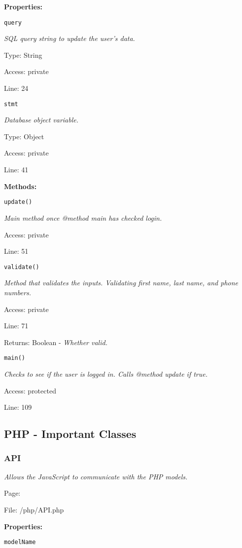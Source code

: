 \textbf{Properties:}

\texttt{query}

{\scriptsize
\textit{SQL query string to update the user's data.}

Type: String

Access: private

Line: 24

}
\texttt{stmt}

{\scriptsize
\textit{Database object variable.}

Type: Object

Access: private

Line: 41

}
\textbf{Methods:}

\texttt{update()}

{\scriptsize
\textit{Main method once @method main has checked login.}

Access: private

Line: 51

}

\texttt{validate()}

{\scriptsize
\textit{Method that validates the inputs.
Validating first name, last name, and phone numbers.}

Access: private

Line: 71

Returns: Boolean - \textit{Whether valid.}

}

\texttt{main()}

{\scriptsize
\textit{Checks to see if the user is logged in.
Calls @method update if true.}

Access: protected

Line: 109

}

\subsection{PHP - Important Classes}
\subsubsection{API}\label{API.php.doc}
\textit{Allows the JavaScript to communicate with the PHP models.}

Page: \pageref{API.php}

File: /php/API.php

\textbf{Properties:}

\texttt{modelName}

